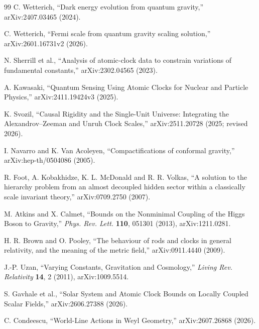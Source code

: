\documentclass[11pt,a4paper]{article}
\begin{document}
\begin{thebibliography}{99}
C. Wetterich,
``Dark energy evolution from quantum gravity,''
arXiv:2407.03465 (2024).

C. Wetterich,
``Fermi scale from quantum gravity scaling solution,''
arXiv:2601.16731v2 (2026).

N. Sherrill et al.,
``Analysis of atomic-clock data to constrain variations of fundamental constants,''
arXiv:2302.04565 (2023).

A. Kawasaki,
``Quantum Sensing Using Atomic Clocks for Nuclear and Particle Physics,''
arXiv:2411.19424v3 (2025).

K. Svozil,
``Causal Rigidity and the Single-Unit Universe: Integrating the Alexandrov--Zeeman and Unruh Clock Scales,''
arXiv:2511.20728 (2025; revised 2026).

I. Navarro and K. Van Acoleyen,
``Compactifications of conformal gravity,''
arXiv:hep-th/0504086 (2005).

R. Foot, A. Kobakhidze, K. L. McDonald and R. R. Volkas,
``A solution to the hierarchy problem from an almost decoupled hidden sector within a classically scale invariant theory,''
arXiv:0709.2750 (2007).

M. Atkins and X. Calmet,
``Bounds on the Nonminimal Coupling of the Higgs Boson to Gravity,''
\emph{Phys. Rev. Lett.} \textbf{110}, 051301 (2013), arXiv:1211.0281.

H. R. Brown and O. Pooley,
``The behaviour of rods and clocks in general relativity, and the meaning of the metric field,''
arXiv:0911.4440 (2009).

J.-P. Uzan,
``Varying Constants, Gravitation and Cosmology,''
\emph{Living Rev. Relativity} \textbf{14}, 2 (2011), arXiv:1009.5514.

S. Gavhale et al.,
``Solar System and Atomic Clock Bounds on Locally Coupled Scalar Fields,''
arXiv:2606.27388 (2026).

C. Condeescu,
``World-Line Actions in Weyl Geometry,''
arXiv:2607.26868 (2026).

\end{thebibliography}
\end{document}
